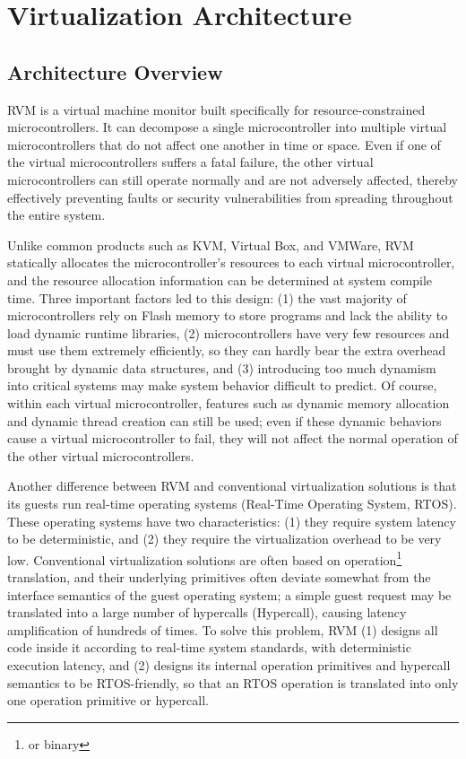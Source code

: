 \chapter{Virtualization Architecture}\label{ch:2-virtualization-architecture}

\section{Architecture Overview}\label{sec:2-1}

RVM is a virtual machine monitor built specifically for resource-constrained microcontrollers. It can decompose a single microcontroller into multiple virtual microcontrollers that do not affect one another in time or space. Even if one of the virtual microcontrollers suffers a fatal failure, the other virtual microcontrollers can still operate normally and are not adversely affected, thereby effectively preventing faults or security vulnerabilities from spreading throughout the entire system.

Unlike common products such as KVM, Virtual
Box, and VMWare, RVM statically allocates the microcontroller's resources to each virtual microcontroller, and the resource allocation information can be determined at system compile time. Three important factors led to this design: (1) the vast majority of microcontrollers rely on Flash memory to store programs and lack the ability to load dynamic runtime libraries, (2) microcontrollers have very few resources and must use them extremely efficiently, so they can hardly bear the extra overhead brought by dynamic data structures, and (3) introducing too much dynamism into critical systems may make system behavior difficult to predict. Of course, within each virtual microcontroller, features such as dynamic memory allocation and dynamic thread creation can still be used; even if these dynamic behaviors cause a virtual microcontroller to fail, they will not affect the normal operation of the other virtual microcontrollers.

Another difference between RVM and conventional virtualization solutions is that its guests run real-time operating systems (Real-Time
Operating
System, RTOS). These operating systems have two characteristics: (1) they require system latency to be deterministic, and (2) they require the virtualization overhead to be very low. Conventional virtualization solutions are often based on operation\footnote{or binary} translation, and their underlying primitives often deviate somewhat from the interface semantics of the guest operating system; a simple guest request may be translated into a large number of hypercalls (Hypercall), causing latency amplification of hundreds of times. To solve this problem, RVM (1) designs all code inside it according to real-time system standards, with deterministic execution latency, and (2) designs its internal operation primitives and hypercall semantics to be RTOS-friendly, so that an RTOS operation is translated into only one operation primitive or hypercall.

